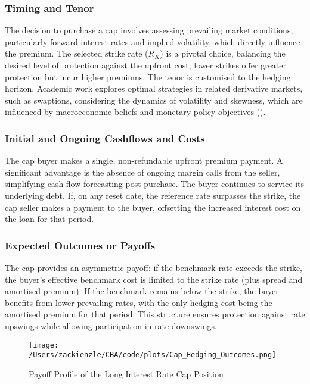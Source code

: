 \documentclass[11pt, a4paper, british]{article}
\begin{document}
\subsubsection{Timing and Tenor}
The decision to purchase a cap involves assessing prevailing market conditions, particularly forward interest rates and implied volatility, which directly influence the premium. The selected strike rate ($R_K$) is a pivotal choice, balancing the desired level of protection against the upfront cost; lower strikes offer greater protection but incur higher premiums. The tenor is customised to the hedging horizon. Academic work explores optimal strategies in related derivative markets, such as swaptions, considering the dynamics of volatility and skewness, which are influenced by macroeconomic beliefs and monetary policy objectives (\cite{ts}).

\subsubsection{Initial and Ongoing Cashflows and Costs}
The cap buyer makes a single, non-refundable upfront premium payment. A significant advantage is the absence of ongoing margin calls from the seller, simplifying cash flow forecasting post-purchase. The buyer continues to service its underlying debt. If, on any reset date, the reference rate surpasses the strike, the cap seller makes a payment to the buyer, offsetting the increased interest cost on the loan for that period.

\subsubsection{Expected Outcomes or Payoffs}
The cap provides an asymmetric payoff: if the benchmark rate exceeds the strike, the buyer's effective benchmark cost is limited to the strike rate (plus spread and amortised premium). If the benchmark remains below the strike, the buyer benefits from lower prevailing rates, with the only hedging cost being the amortised premium for that period. This structure ensures protection against rate upswings while allowing participation in rate downswings.

\begin{figure}[H]
 \centering
 \texttt{[image: /Users/zackienzle/CBA/code/plots/Cap\_Hedging\_Outcomes.png]} 
 \caption{Payoff Profile of the Long Interest Rate Cap Position}
    \label{fig:LongCapsPayoff}
\end{figure}
\end{document}
